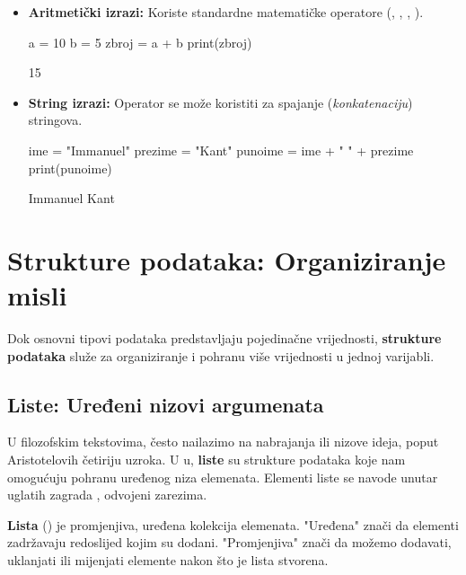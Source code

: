 \begin{itemize}[leftmargin=*]
    \item \textbf{Aritmetički izrazi:} Koriste standardne matematičke operatore (\pyinline{+}, \pyinline{-}, \pyinline{*}, \pyinline{/}).
    \begin{pythoncode}
a = 10
b = 5
zbroj = a + b
print(zbroj)
    \end{pythoncode}
    \begin{codeoutput}
15
    \end{codeoutput}

    \item \textbf{String izrazi:} Operator \pyinline{+} se može koristiti za spajanje (\textit{konkatenaciju}) stringova.
    \begin{pythoncode}
ime = "Immanuel"
prezime = "Kant"
punoime = ime + " " + prezime
print(punoime)
    \end{pythoncode}
    \begin{codeoutput}
Immanuel Kant
    \end{codeoutput}
\end{itemize}

\section{Strukture podataka: Organiziranje misli}
\label{sec:strukturepodataka}

Dok osnovni tipovi podataka predstavljaju pojedinačne vrijednosti, \textbf{strukture podataka} služe za organiziranje i pohranu više vrijednosti u jednoj varijabli.

\subsection{Liste: Uređeni nizovi argumenata}

U filozofskim tekstovima, često nailazimo na nabrajanja ili nizove ideja, poput Aristotelovih četiriju uzroka. U u, \textbf{liste} su strukture podataka koje nam omogućuju pohranu uređenog niza elemenata. Elementi liste se navode unutar uglatih zagrada \pyinline{[]}, odvojeni zarezima.

\begin{definicijaokvir}
    \textbf{Lista} () je promjenjiva, uređena kolekcija elemenata. "Uređena" znači da elementi zadržavaju redoslijed kojim su dodani. "Promjenjiva" znači da možemo dodavati, uklanjati ili mijenjati elemente nakon što je lista stvorena.
\end{definicijaokvir}

